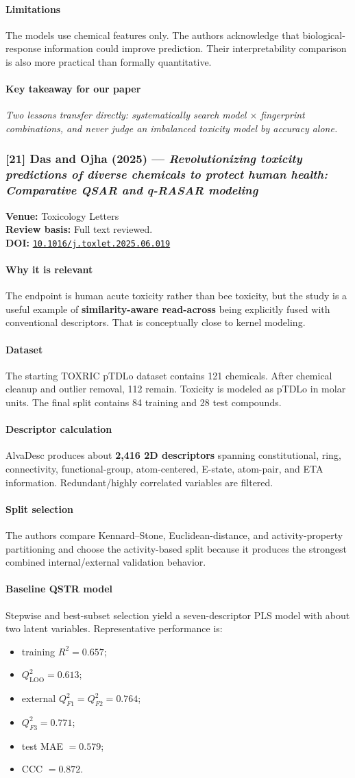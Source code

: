 \documentclass[11pt]{article}
\newcommand{\reviewfield}[2]{\paragraph{#1}#2}
\newcommand{\keytakeaway}[1]{\paragraph{Key takeaway for our paper}\emph{#1}}
\newcommand{\paperdoi}[1]{\href{https://doi.org/#1}{\texttt{#1}}}
\begin{document}
\reviewfield{Limitations}{
The models use chemical features only. The authors acknowledge that biological-response information could improve prediction. Their interpretability comparison is also more practical than formally quantitative.
}

\keytakeaway{Two lessons transfer directly: systematically search model $\times$ fingerprint combinations, and never judge an imbalanced toxicity model by accuracy alone.}

\subsubsection{[21] Das and Ojha (2025) --- \textit{Revolutionizing toxicity predictions of diverse chemicals to protect human health: Comparative QSAR and q-RASAR modeling}}
\textbf{Venue:} Toxicology Letters\\
\textbf{Review basis:} Full text reviewed.\\
\textbf{DOI:} \paperdoi{10.1016/j.toxlet.2025.06.019}

\reviewfield{Why it is relevant}{
The endpoint is human acute toxicity rather than bee toxicity, but the study is a useful example of \textbf{similarity-aware read-across} being explicitly fused with conventional descriptors. That is conceptually close to kernel modeling.
}

\reviewfield{Dataset}{
The starting TOXRIC pTDLo dataset contains 121 chemicals. After chemical cleanup and outlier removal, 112 remain. Toxicity is modeled as pTDLo in molar units. The final split contains 84 training and 28 test compounds.
}

\reviewfield{Descriptor calculation}{
AlvaDesc produces about \textbf{2,416 2D descriptors} spanning constitutional, ring, connectivity, functional-group, atom-centered, E-state, atom-pair, and ETA information. Redundant/highly correlated variables are filtered.
}

\reviewfield{Split selection}{
The authors compare Kennard--Stone, Euclidean-distance, and activity-property partitioning and choose the activity-based split because it produces the strongest combined internal/external validation behavior.
}

\reviewfield{Baseline QSTR model}{
Stepwise and best-subset selection yield a seven-descriptor PLS model with about two latent variables. Representative performance is:
\begin{itemize}
    \item training $R^2=0.657$;
    \item $Q^2_{\mathrm{LOO}}=0.613$;
    \item external $Q^2_{F1}=Q^2_{F2}=0.764$;
    \item $Q^2_{F3}=0.771$;
    \item test MAE $=0.579$;
    \item CCC $=0.872$.
\end{itemize}
}
\end{document}
